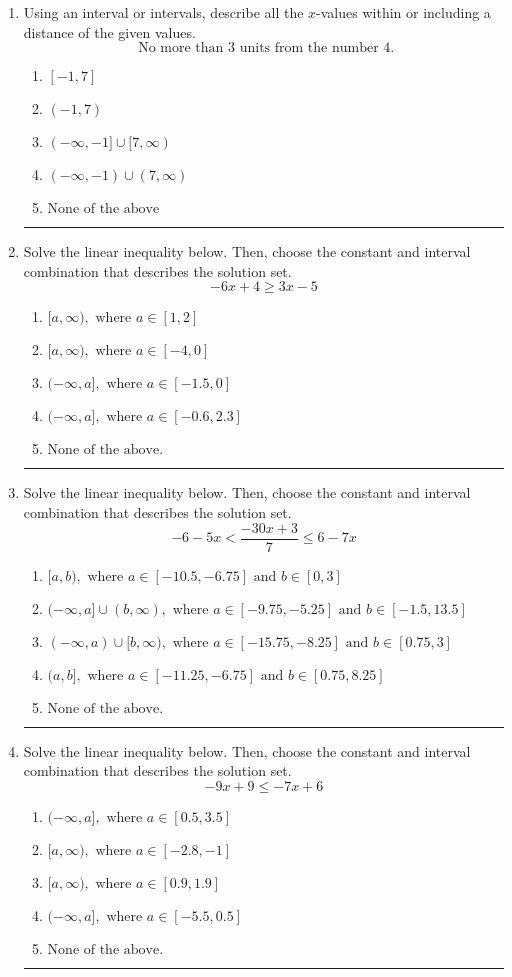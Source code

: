 \documentclass[14pt]{extbook}
\newcommand{\litem}[1]{\item#1\hspace*{-1cm}\rule{\textwidth}{0.4pt}}
\begin{document}
\begin{enumerate}
\litem{
Using an interval or intervals, describe all the $x$-values within or including a distance of the given values.\[ \text{ No more than } 3 \text{ units from the number } 4. \]\begin{enumerate}[label=\Alph*.]
\item \( [-1, 7] \)
\item \( (-1, 7) \)
\item \( (-\infty, -1] \cup [7, \infty) \)
\item \( (-\infty, -1) \cup (7, \infty) \)
\item \( \text{None of the above} \)

\end{enumerate} }
\litem{
Solve the linear inequality below. Then, choose the constant and interval combination that describes the solution set.\[ -6x + 4 \geq 3x -5 \]\begin{enumerate}[label=\Alph*.]
\item \( [a, \infty), \text{ where } a \in [1, 2] \)
\item \( [a, \infty), \text{ where } a \in [-4, 0] \)
\item \( (-\infty, a], \text{ where } a \in [-1.5, 0] \)
\item \( (-\infty, a], \text{ where } a \in [-0.6, 2.3] \)
\item \( \text{None of the above}. \)

\end{enumerate} }
\litem{
Solve the linear inequality below. Then, choose the constant and interval combination that describes the solution set.\[ -6 - 5 x < \frac{-30 x + 3}{7} \leq 6 - 7 x \]\begin{enumerate}[label=\Alph*.]
\item \( [a, b), \text{ where } a \in [-10.5, -6.75] \text{ and } b \in [0, 3] \)
\item \( (-\infty, a] \cup (b, \infty), \text{ where } a \in [-9.75, -5.25] \text{ and } b \in [-1.5, 13.5] \)
\item \( (-\infty, a) \cup [b, \infty), \text{ where } a \in [-15.75, -8.25] \text{ and } b \in [0.75, 3] \)
\item \( (a, b], \text{ where } a \in [-11.25, -6.75] \text{ and } b \in [0.75, 8.25] \)
\item \( \text{None of the above.} \)

\end{enumerate} }
\litem{
Solve the linear inequality below. Then, choose the constant and interval combination that describes the solution set.\[ -9x + 9 \leq -7x + 6 \]\begin{enumerate}[label=\Alph*.]
\item \( (-\infty, a], \text{ where } a \in [0.5, 3.5] \)
\item \( [a, \infty), \text{ where } a \in [-2.8, -1] \)
\item \( [a, \infty), \text{ where } a \in [0.9, 1.9] \)
\item \( (-\infty, a], \text{ where } a \in [-5.5, 0.5] \)
\item \( \text{None of the above}. \)


\end{enumerate}}
\end{enumerate}
\end{document}
